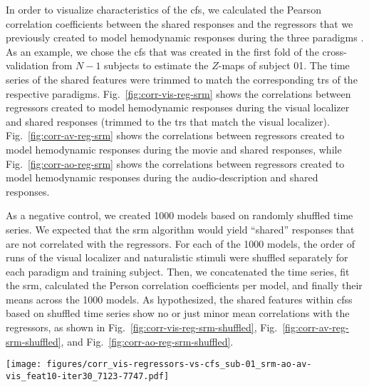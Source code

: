 In order to visualize characteristics of the \ac{cfs}, we calculated the Pearson
correlation coefficients between the shared responses and the regressors that we
previously created to model hemodynamic responses during the three paradigms
\citep[cf.][]{sengupta2016extension, haeusler2022processing}.
%
As an example, we chose the \ac{cfs} that was created in the first fold of the
cross-validation from $N-1$ subjects to estimate the $Z$-maps of subject 01.
%
The time series of the shared features were trimmed to match the corresponding
\acp{tr} of the respective paradigms.
%
Fig.~\ref{fig:corr-vis-reg-srm} shows the correlations between regressors
created to model hemodynamic responses during the visual localizer and shared
responses (trimmed to the \acp{tr} that match the visual localizer).
Fig.~\ref{fig:corr-av-reg-srm} shows the correlations between regressors created
to model hemodynamic responses during the movie \citep[cf. Table 3
in][]{haeusler2022processing} and shared responses, while
Fig.~\ref{fig:corr-ao-reg-srm} shows the correlations between regressors created
to model hemodynamic responses during the audio-description \citep[cf. Table 3
in][]{haeusler2022processing} and shared responses.




As a negative control, we created 1000 models based on randomly shuffled time
series.
%
We expected that the \ac{srm} algorithm would yield ``shared'' responses that
are not correlated with the regressors.
%
For each of the 1000 models, the order of runs of the visual localizer and
naturalistic stimuli were shuffled separately for each paradigm and training
subject.
%
Then, we concatenated the time series, fit the \ac{srm}, calculated the Person
correlation coefficients per model, and finally their means across the 1000
models.
%
As hypothesized, the shared features within \acp{cfs} based on shuffled time
series show no or just minor mean correlations with the regressors, as shown in
%
Fig.~\ref{fig:corr-vis-reg-srm-shuffled},
%
Fig.~\ref{fig:corr-av-reg-srm-shuffled}, and
%
Fig.~\ref{fig:corr-ao-reg-srm-shuffled}.


\begin{figure*}[tbp]
\centering
\texttt{[image: figures/corr\_vis-regressors-vs-cfs\_sub-01\_srm-ao-av-vis\_feat10-iter30\_7123-7747.pdf]}
\caption{
%
\textbf{Similarity of hemodynamic reponses modeled for the analysis of
    visual localizer in \citet{sengupta2016extension} and shared features
    calculated by the shared response model (SRM) for subject 01 in the first
    fold of the cross-validation.}
    Before calculating the Pearson correlation coefficients plotted in the
    figure, the time series of the shared features within the multi-paradigm
    \ac{cfs} were trimmed to match the corresponding \acp{tr} of the visual
    localizer paradigm \citep{sengupta2016extension}.
    The modeled hemodynamic responses represent predicted responses to
    the six categories of pictures that were presented in blocks.
    }
\label{fig:corr-vis-reg-srm}
\end{figure*}


